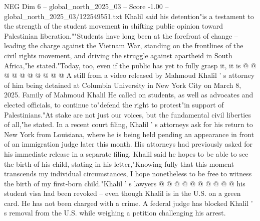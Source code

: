 \begin{textsample}{NEG Dim 6 – global\_north\_2025\_03 – Score -1.00 – global\_north\_2025\_03/122549551.txt}
Khalil said his detention"is a testament to the strength of the student movement in shifting public opinion toward Palestinian liberation.""Students have long been at the forefront of change -- leading the charge against the Vietnam War, standing on the frontlines of the civil rights movement, and driving the struggle against apartheid in South Africa,"he stated."Today, too, even if the public has yet to fully grasp it, it is @ @ @ @ @ @ @ @ @ @ A still from a video released by Mahmoud Khalil ' s attorney of him being detained at Columbia University in New York City on March 8, 2025.
Family of Mahmoud Khalil He called on students, as well as advocates and elected officials, to continue to"defend the right to protest"in support of Palestinians."At stake are not just our voices, but the fundamental civil liberties of all,"he stated.
In a recent court filing, Khalil ' s attorneys ask for his return to New York from Louisiana, where he is being held pending an appearance in front of an immigration judge later this month.
His attorneys had previously asked for his immediate release in a separate filing.
Khalil said he hopes to be able to see the birth of his child, stating in his letter,"Knowing fully that this moment transcends my individual circumstances, I hope nonetheless to be free to witness the birth of my first-born child."Khalil ' s lawyers @ @ @ @ @ @ @ @ @ @ his student visa had been revoked -- even though Khalil is in the U.S. on a green card.
He has not been charged with a crime.
A federal judge has blocked Khalil ' s removal from the U.S. while weighing a petition challenging his arrest.

\end{textsample}
